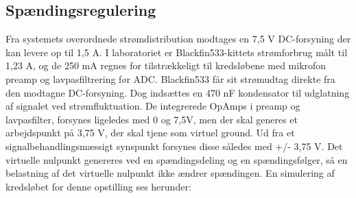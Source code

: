
\subsection{Spændingsregulering}
Fra systemets overordnede strømdistribution modtages en 7,5 V DC-forsyning der kan levere op til 1,5 A. I laboratoriet er Blackfin533-kittets strømforbrug målt til 1,23 A, og de 250 mA regnes for tilstrækkeligt til kredsløbene med mikrofon preamp og lavpasfiltrering før ADC.
Blackfin533 får sit strømudtag direkte fra den modtagne DC-forsyning. Dog indsættes en 470 nF kondensator til udglatning af signalet ved strømfluktuation. De integrerede OpAmps i preamp og lavpasfilter, forsynes ligeledes med 0 og 7,5V, men der skal generes et arbejdspunkt på 3,75 V, der skal tjene som virtuel ground. Ud fra et signalbehandlingsmæssigt synspunkt forsynes disse således med +/- 3,75 V.
Det virtuelle nulpunkt genereres ved en spændingsdeling og en spændingsfølger, så en belastning af det virtuelle nulpunkt ikke ændrer spændingen. En simulering af kredsløbet for denne opstilling ses herunder:  



